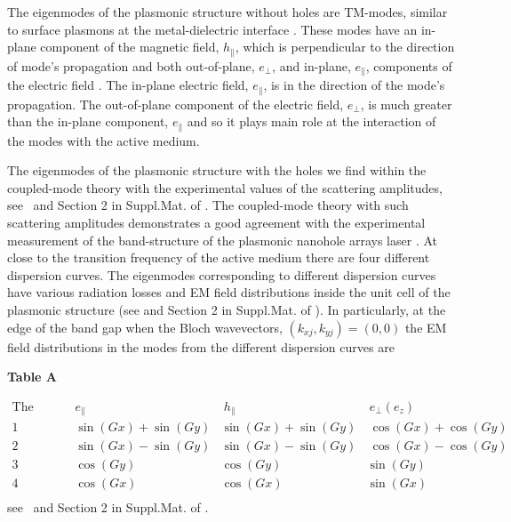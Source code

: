 \documentclass[aps,pra,amsmath,amssymb,onecolumn,superscriptaddress,showpacs,floatfix,]{revtex4-1}
\begin{document}
The eigenmodes of the plasmonic structure without holes are TM-modes, similar to surface plasmons at the metal-dielectric interface \cite{TennerJOpt,TennerACSPhot}. 
These modes have an in-plane component of the magnetic field, $h_{\parallel}$, which is perpendicular to the direction of mode's propagation and both out-of-plane, $e_{\perp}$, and in-plane, $e_{\parallel}$, components of the electric field \cite{TennerJOpt,TennerACSPhot}. 
The in-plane electric field, $e_{\parallel}$, is in the direction of the mode's propagation. 
The out-of-plane component of the electric field, $e_{\perp}$, is much greater than the in-plane component, $e_{\parallel}$ \cite{TennerJOpt,TennerACSPhot} and so it plays main role at the interaction of the modes with the active medium.

The eigenmodes of the plasmonic structure with the holes we find within the coupled-mode theory with the experimental values of the scattering amplitudes, see~\cite{TennerJOpt,TennerACSPhot} and Section 2 in Suppl.Mat. of \cite{nefedkin2018acsphot}. The coupled-mode theory with such scattering amplitudes demonstrates a good agreement with the experimental measurement of the band-structure of the plasmonic nanohole arrays laser \cite{TennerJOpt}.
At close to the transition frequency of the active medium there are four different dispersion curves. The eigenmodes corresponding to different dispersion curves have various radiation losses and EM field distributions inside the unit cell of the plasmonic structure (see \cite{TennerJOpt,TennerACSPhot} and Section 2 in Suppl.Mat. of \cite{nefedkin2018acsphot}). In particularly, at the edge of the band gap when the Bloch wavevectors, $\left(k_{xj}, k_{yj}\right) = \left(0, 0\right)$  the EM field distributions in the modes from the different dispersion curves are 

\textbf{Table A}

$\begin{array}{cccc}
\text{The number of the dispersive curve} & e_{\parallel} & \
h_{\parallel} & \
e_ {\perp } \left( e_z \right) \\
\text{1} & \sin (G x)+\sin (G y) & \sin (G x)+\sin (G y) & \
\cos (G x)+\cos (G y) \\
\text{2} & \sin (G x)-\sin (G y) & \sin (G x)-\sin (G y) & \
\cos (G x)-\cos (G y) \\
\text{3} & \cos (G y) & \cos (G y) & \sin (G y) \\
\text{4} & \cos (G x) & \cos (G x) & \sin (G x) \\
\end{array}$
\\
see~\cite{TennerJOpt,TennerACSPhot} and Section 2 in Suppl.Mat. of \cite{nefedkin2018acsphot}.
\end{document}
